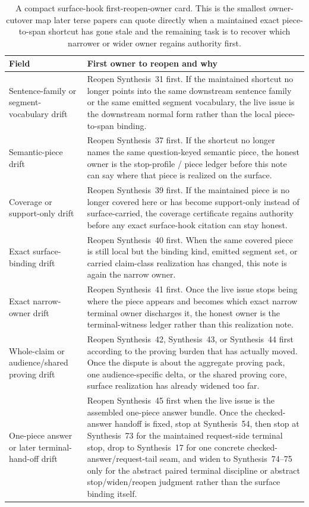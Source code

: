 \documentclass[11pt]{article}
\begin{document}
\begin{table}[t]
\centering
\small
\begin{tabularx}{\linewidth}{@{}lX@{}}
\toprule
Field & First owner to reopen and why \\
\midrule
Sentence-family or segment-vocabulary drift & Reopen Synthesis~31 first. If the maintained shortcut no longer points into the same downstream sentence family or the same emitted segment vocabulary, the live issue is the downstream normal form rather than the local piece-to-span binding. \\
Semantic-piece drift & Reopen Synthesis~37 first. If the shortcut no longer names the same question-keyed semantic piece, the honest owner is the stop-profile / piece ledger before this note can say where that piece is realized on the surface. \\
Coverage or support-only drift & Reopen Synthesis~39 first. If the maintained piece is no longer covered here or has become support-only instead of \textsf{surface}-carried, the coverage certificate regains authority before any exact surface-hook citation can stay honest. \\
Exact surface-binding drift & Reopen Synthesis~40 first. When the same covered piece is still local but the binding kind, emitted segment set, or carried claim-class realization has changed, this note is again the narrow owner. \\
Exact narrow-owner drift & Reopen Synthesis~41 first. Once the live issue stops being where the piece appears and becomes which exact narrow terminal owner discharges it, the honest owner is the terminal-witness ledger rather than this realization note. \\
Whole-claim or audience/shared proving drift & Reopen Synthesis~42, Synthesis~43, or Synthesis~44 first according to the proving burden that has actually moved. Once the dispute is about the aggregate proving pack, one audience-specific delta, or the shared proving core, surface realization has already widened too far. \\
One-piece answer or later terminal-hand-off drift & Reopen Synthesis~45 first when the live issue is the assembled one-piece answer bundle. Once the checked-answer handoff is fixed, stop at Synthesis~54, then stop at Synthesis~73 for the maintained request-side terminal stop, drop to Synthesis~17 for one concrete checked-answer/request-tail seam, and widen to Synthesis~74--75 only for the abstract paired terminal discipline or abstract stop/widen/reopen judgment rather than the surface binding itself. \\
\bottomrule
\end{tabularx}
\caption{A compact surface-hook first-reopen-owner card. This is the smallest owner-cutover map later terse papers can quote directly when a maintained exact piece-to-span shortcut has gone stale and the remaining task is to recover which narrower or wider owner regains authority first.}
\label{tab:surface-hook-first-reopen-owner-card}
\end{table}
\end{document}

